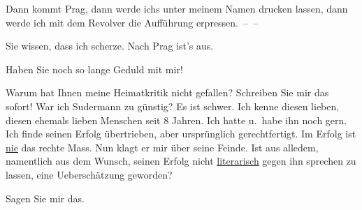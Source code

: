\pstart
           Dann kommt Prag, dann werde ichs unter meinem
               Namen drucken lassen, dann werde ich mit dem Revolver die Aufführung
               erpressen. – –\pend
           
\pstart
           Sie wissen, dass ich scherze. Nach {\pb}Prag ist’s aus.\pend
           
\pstart
           Haben Sie noch so lange Geduld mit mir!\pend
           
\pstart
           Warum hat Ihnen meine Heimatkritik nicht gefallen? Schreiben Sie mir das sofort! War ich Sudermann zu günstig? Es ist schwer. Ich kenne
               diesen lieben, diesen ehemals lieben Menschen seit 8 Jahren. Ich hatte u. habe ihn noch gern.
               Ich finde seinen Erfolg übertrieben, aber ursprünglich gerechtfertigt. Im Erfolg ist
                  \uline{nie} das rechte Mass. Nun klagt er mir über seine
               Feinde. Ist aus alledem, namentlich aus dem Wunsch, seinen Erfolg nicht \uline{literarisch} gegen ihn sprechen zu lassen, eine
               Ueberschätzung geworden?\pend
           
\pstart
           Sagen Sie mir das.\pend
           
